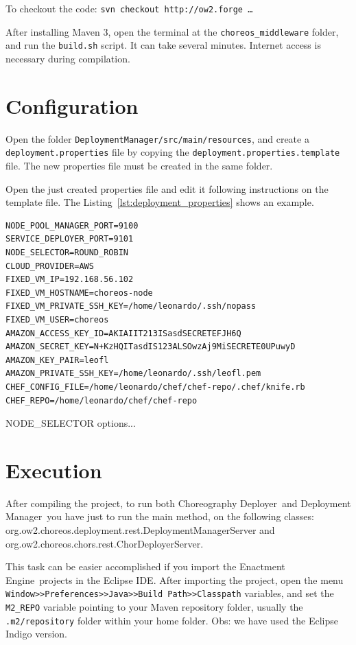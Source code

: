 \documentclass[a4paper, 10pt]{article}
\newcommand{\ee}{Enactment Engine}
\newcommand{\cd}{Choreography Deployer}
\newcommand{\dm}{Deployment Manager}
\begin{document}
To checkout the code: \texttt{svn checkout http://ow2.forge \dots}

After installing Maven 3, open the terminal at the \texttt{choreos\_middleware} folder, and run the \texttt{build.sh} script. It can take several minutes. Internet access is necessary during compilation.

\section{Configuration}

Open the folder \texttt{DeploymentManager/src/main/resources}, and create a \texttt{deployment.properties} file by copying the \texttt{deployment.properties.template} file. The new properties file must be created in the same folder.

Open the just created properties file and edit it following instructions on the template file. The Listing~\ref{lst:deployment_properties} shows an example.

\lstset{
numbers=left
}

{\footnotesize
\begin{lstlisting}[caption=deployment.properties example,label=lst:deployment_properties] 
NODE_POOL_MANAGER_PORT=9100
SERVICE_DEPLOYER_PORT=9101
NODE_SELECTOR=ROUND_ROBIN
CLOUD_PROVIDER=AWS
FIXED_VM_IP=192.168.56.102
FIXED_VM_HOSTNAME=choreos-node
FIXED_VM_PRIVATE_SSH_KEY=/home/leonardo/.ssh/nopass
FIXED_VM_USER=choreos
AMAZON_ACCESS_KEY_ID=AKIAIIT213ISasdSECRETEFJH6Q
AMAZON_SECRET_KEY=N+KzHQITasdIS123ALSOwzAj9MiSECRETE0UPuwyD
AMAZON_KEY_PAIR=leofl
AMAZON_PRIVATE_SSH_KEY=/home/leonardo/.ssh/leofl.pem
CHEF_CONFIG_FILE=/home/leonardo/chef/chef-repo/.chef/knife.rb
CHEF_REPO=/home/leonardo/chef/chef-repo
\end{lstlisting}
}

NODE\_SELECTOR options...


\section{Execution}

After compiling the project, to run both \cd\ and \dm\ you have just to run the main method, on the following classes: \textsf{org.ow2.choreos.deployment.rest.DeploymentManagerServer} and \textsf{org.ow2.choreos.chors.rest.ChorDeployerServer}.

This task can be easier accomplished if you import the \ee\ projects in the Eclipse IDE. After importing the project, open the menu \texttt{Window>>Preferences>>Java>>Build Path>>Classpath} variables, and set the \texttt{M2\_REPO} variable pointing to your Maven repository folder, usually the \texttt{.m2/repository} folder within your home folder. Obs: we have used the Eclipse Indigo version.
\end{document}
